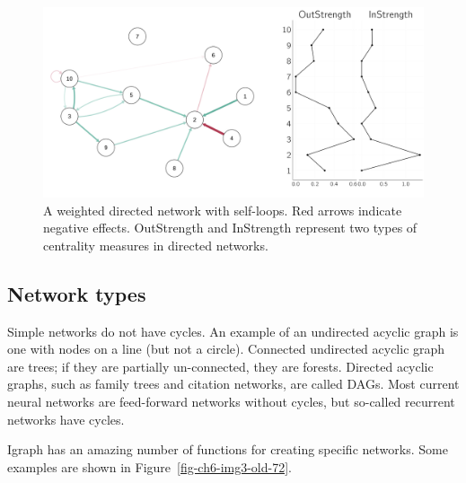 \documentclass[
  a4paper,
  DIV=11,
  numbers=noendperiod,
  oneside]{scrreprt}
\begin{document}
\begin{figure}

{\centering \includegraphics{media/ch6/fig-ch6-img2-old-71.png}

}

\caption{\label{fig-ch6-img2-old-71}A weighted directed network with
self-loops. Red arrows indicate negative effects. OutStrength and
InStrength represent two types of centrality measures in directed
networks.}

\end{figure}

\hypertarget{sec-Network-types}{%
\subsection{Network types}\label{sec-Network-types}}

Simple networks do not have cycles. An example of an undirected acyclic
graph is one with nodes on a line (but not a circle). Connected
undirected acyclic graph are trees; if they are partially un-connected,
they are forests. Directed acyclic graphs, such as family trees and
citation networks, are called DAGs. Most current neural networks are
feed-forward networks without cycles, but so-called recurrent networks
have cycles.

Igraph has an amazing number of functions for creating specific
networks. Some examples are shown in Figure~\ref{fig-ch6-img3-old-72}.
\end{document}
